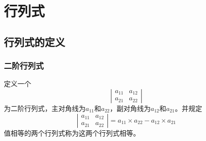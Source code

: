 \chapter{行列式}
\section{行列式的定义}
\subsection{二阶行列式}
定义一个
$$
\left|\begin{array}{cc} a_{11} & a_{12} \\
a_{21} & a_{22} \end{array}\right|
$$
为二阶行列式，主对角线为$a_{11}$和$a_{22}$，副对角线为$a_{12}$和$a_{21}$。并规定
$$
\left|\begin{array}{cc} a_{11} & a_{12} \\
a_{21} & a_{22} \end{array}\right|=a_{11}\times a_{22}-a_{12}\times a_{21}
$$
值相等的两个行列式称为这两个行列式相等。\\
